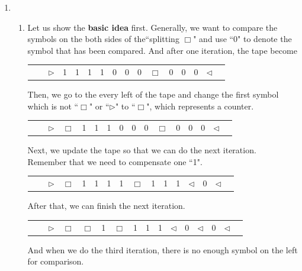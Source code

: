 \documentclass[12pt,a4paper]{article}
\makeatletter
\newtheorem*{solution}{Solution}
\theoremstyle{definition}
\renewenvironment{solution}[1][Solution] {\par\pushQED{\qed}\normalfont\topsep6\p@\@plus6\p@\relax\trivlist\item[\hskip\labelsep\bfseries#1\@addpunct{.}]\ignorespaces}{\popQED\endtrivlist\@endpefalse} \makeatother
\makeatother
\begin{document}
\begin{enumerate}
    \begin{solution}
    ~
    \begin{enumerate}
        \item 
        Let us show the \textbf{basic idea} first. Generally, we want to compare the symbols on the both sides of the``splitting $\Box$" and use ``0" to denote the symbol that has been compared.  And after one iteration, the tape become
        \begin{center}
		\begin{tabular}{ll|c|c|c|c|c|c|c|c|c|c|c|c|c|c}
			\cline{2-16}
			& & $\triangleright$ &  1  & 1 & 1 & 1 & 0 & 0 & 0 & $\Box$ & 0 & 0 & 0 & $ \triangleleft$ & \\
			\cline{2-16}
		\end{tabular}
	    \end{center}
	    Then, we go to the every left of the tape and change the first symbol which is not ``$\Box$" or ``$\triangleright$" to ``$\Box$", which represents a counter. 
	    \begin{center}
		\begin{tabular}{ll|c|c|c|c|c|c|c|c|c|c|c|c|c|c}
			\cline{2-16}
			& & $\triangleright$ &  $\Box$  & 1 & 1 & 1 & 0 & 0 & 0 & $\Box$ & 0 & 0 & 0 & $ \triangleleft$ & \\
			\cline{2-16}
		\end{tabular}
	    \end{center}
	    Next, we update the tape so that we can do the next iteration. Remember that we need to compensate one ``1".
	    \begin{center}
		\begin{tabular}{ll|c|c|c|c|c|c|c|c|c|c|c|c|c|c}
			\cline{2-16}
			& & $\triangleright$ &  $\Box$  & 1 & 1 & 1 & 1 & $\Box$ & 1 & 1 & 1  & $\triangleleft$ & 0 & $ \triangleleft$ & \\
			\cline{2-16}
		\end{tabular}
	    \end{center}
	    After that, we can finish the next iteration.
	    \begin{center}
		\begin{tabular}{ll|c|c|c|c|c|c|c|c|c|c|c|c|c|c}
			\cline{2-16}
			& & $\triangleright$ &  $\Box$  & $\Box$ & 1 & $\Box$ & 1 & 1 & 1 & $\triangleleft$ & 0  & $\triangleleft$ & 0 & $ \triangleleft$ & \\
			\cline{2-16}
		\end{tabular}
	    \end{center}
	    And when we do the third iteration, there is no enough symbol on the left for comparison.

\end{enumerate}
\end{solution}
\end{enumerate}
\end{document}
